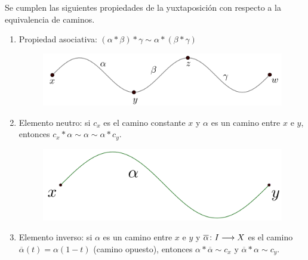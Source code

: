\documentclass[GTS.tex]{subfiles}
\begin{document}
\begin{prop} Se cumplen las siguientes propiedades de la yuxtaposición con respecto a la equivalencia de caminos.
\begin{enumerate}
\item Propiedad asociativa: $(\alpha*\beta)*\gamma\sim\alpha*(\beta*\gamma)$
\begin{figure}[h!]
	\centering
	\includegraphics[scale=0.2]{propi1}
\end{figure}

\item Elemento neutro: si $c_x$ es el camino constante $x$ y $\alpha$ es un camino entre $x$ e $y$, entonces $c_x*\alpha\sim\alpha\sim\alpha*c_y$.
\begin{figure}[h!]
	\centering
	\includegraphics[scale=0.1]{propi2}
\end{figure}
\item Elemento inverso: si $\alpha$ es un camino entre $x$ e $y$ y $\overline{\alpha}\colon{I}\longrightarrow{X}$ es el camino $\overline{\alpha}(t)=\alpha(1-t)$ (camino opuesto), entonces $\alpha*\overline{\alpha}\sim c_x$ y $\overline{\alpha}*\alpha\sim c_y$.
\end{enumerate}
\end{prop}

\vspace{1cm}
\end{document}
